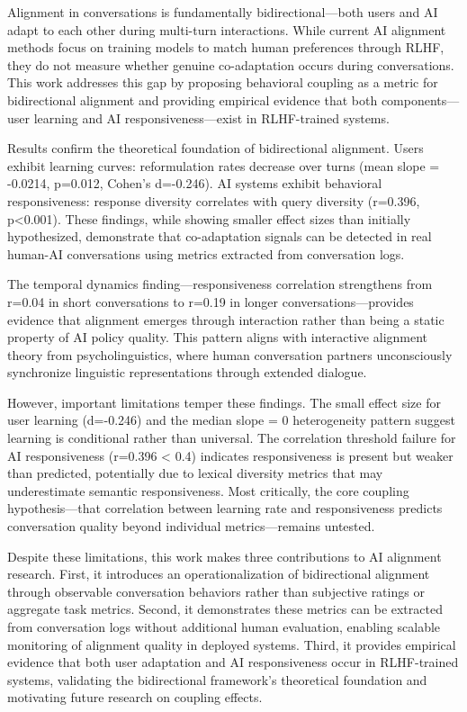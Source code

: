 
Alignment in conversations is fundamentally bidirectional---both users and AI adapt to each other during multi-turn interactions. While current AI alignment methods focus on training models to match human preferences through RLHF, they do not measure whether genuine co-adaptation occurs during conversations. This work addresses this gap by proposing behavioral coupling as a metric for bidirectional alignment and providing empirical evidence that both components---user learning and AI responsiveness---exist in RLHF-trained systems.

Results confirm the theoretical foundation of bidirectional alignment. Users exhibit learning curves: reformulation rates decrease over turns (mean slope = -0.0214, p=0.012, Cohen's d=-0.246). AI systems exhibit behavioral responsiveness: response diversity correlates with query diversity (r=0.396, p<0.001). These findings, while showing smaller effect sizes than initially hypothesized, demonstrate that co-adaptation signals can be detected in real human-AI conversations using metrics extracted from conversation logs.

The temporal dynamics finding---responsiveness correlation strengthens from r=0.04 in short conversations to r=0.19 in longer conversations---provides evidence that alignment emerges through interaction rather than being a static property of AI policy quality. This pattern aligns with interactive alignment theory from psycholinguistics, where human conversation partners unconsciously synchronize linguistic representations through extended dialogue.

However, important limitations temper these findings. The small effect size for user learning (d=-0.246) and the median slope = 0 heterogeneity pattern suggest learning is conditional rather than universal. The correlation threshold failure for AI responsiveness (r=0.396 < 0.4) indicates responsiveness is present but weaker than predicted, potentially due to lexical diversity metrics that may underestimate semantic responsiveness. Most critically, the core coupling hypothesis---that correlation between learning rate and responsiveness predicts conversation quality beyond individual metrics---remains untested.

Despite these limitations, this work makes three contributions to AI alignment research. First, it introduces an operationalization of bidirectional alignment through observable conversation behaviors rather than subjective ratings or aggregate task metrics. Second, it demonstrates these metrics can be extracted from conversation logs without additional human evaluation, enabling scalable monitoring of alignment quality in deployed systems. Third, it provides empirical evidence that both user adaptation and AI responsiveness occur in RLHF-trained systems, validating the bidirectional framework's theoretical foundation and motivating future research on coupling effects.


